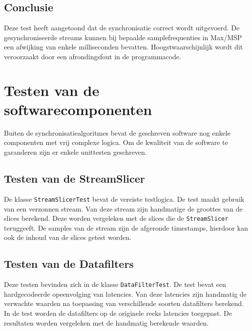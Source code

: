 \subsection{Conclusie}

Deze test heeft aangetoond dat de synchronisatie correct wordt uitgevoerd. De gesynchroniseerde streams kunnen bij bepaalde samplefrequenties in Max/MSP een afwijking van enkele milliseconden bevatten. Hoogstwaarschijnlijk wordt dit veroorzaakt door een afrondingsfout in de programmacode.

\section{Testen van de softwarecomponenten}

Buiten de synchronisatiealgoritmes bevat de geschreven software nog enkele componenten met vrij complexe logica. Om de kwaliteit van de software te garanderen zijn er enkele unittesten geschreven.

\subsection{Testen van de StreamSlicer}

De klasse \texttt{StreamSlicerTest} bevat de vereiste testlogica. De test maakt gebruik van een verzonnen stream. Van deze stream zijn handmatige de groottes van de slices berekend. Deze worden vergeleken met de slices die de \texttt{StreamSlicer} teruggeeft. De samples van de stream zijn de afgeronde timestamps, hierdoor kan ook de inhoud van de slices getest worden.


\subsection{Testen van de Datafilters}


Deze testen bevinden zich in de klasse \texttt{DataFilterTest}. De test bevat een hardgecodeerde opeenvolging van latencies. Van deze latencies zijn handmatig de verwachte waarden na toepassing van verschillende soorten datafilters berekend. In de test worden de datafilters op de originele reeks latencies toegepast. De resultaten worden vergeleken met de handmatig berekende waarden.